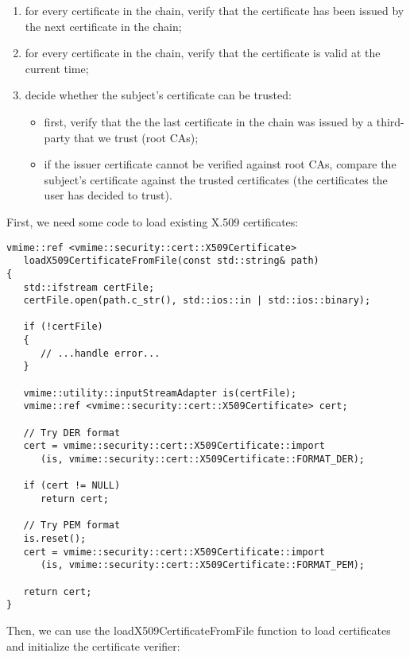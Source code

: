 \begin{enumerate}
\item for every certificate in the chain, verify that the certificate has been
issued by the next certificate in the chain;
\item for every certificate in the chain, verify that the certificate is valid
at the current time;
\item decide whether the subject's certificate can be trusted:
	\begin{itemize}
	\item first, verify that the the last certificate in the chain was
	issued by a third-party that we trust (root CAs);
	\item if the issuer certificate cannot be verified against root CAs,
	compare the subject's certificate against the trusted certificates
	(the certificates the user has decided to trust).
	\end{itemize}
\end{enumerate}

First, we need some code to load existing X.509 certificates:

\begin{lstlisting}[caption={Reading a X.509 certificate from a file}]
vmime::ref <vmime::security::cert::X509Certificate>
   loadX509CertificateFromFile(const std::string& path)
{
   std::ifstream certFile;
   certFile.open(path.c_str(), std::ios::in | std::ios::binary);

   if (!certFile)
   {
      // ...handle error...
   }

   vmime::utility::inputStreamAdapter is(certFile);
   vmime::ref <vmime::security::cert::X509Certificate> cert;

   // Try DER format
   cert = vmime::security::cert::X509Certificate::import
      (is, vmime::security::cert::X509Certificate::FORMAT_DER);

   if (cert != NULL)
      return cert;

   // Try PEM format
   is.reset();
   cert = vmime::security::cert::X509Certificate::import
      (is, vmime::security::cert::X509Certificate::FORMAT_PEM);

   return cert;
}
\end{lstlisting}

Then, we can use the {\vcode loadX509CertificateFromFile} function to load
certificates and initialize the certificate verifier:

